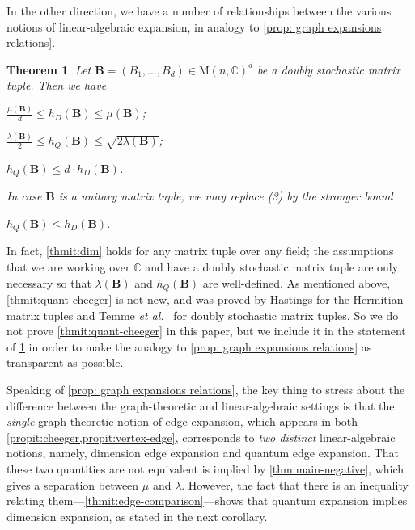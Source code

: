 \documentclass[11pt]{article}
\newtheorem{theorem}{Theorem}[section]
\theoremstyle{plain}
\numberwithin{equation}{section}
\theoremstyle{definition}
\newcommand{\bC}{\mathbb{C}}
\newcommand{\M}{\mathrm{M}}
\newcommand{\tuple}[1]{\mathbf{#1}}
\newcommand{\vB}{\tuple{B}}
\begin{document}
In the other direction, we have a number of relationships between the various notions of linear-algebraic expansion, in analogy to \cref{prop: graph expansions relations}.
\begin{theorem}\label{thm:main-relationships}
    Let $\vB=(B_1,\dots,B_d) \in \M(n,\bC)^d$ be a doubly stochastic matrix tuple. Then we have
    \begin{thmenum}
        \item $\frac {\mu(\vB)}d \leq h_D(\vB) \leq \mu(\vB)$;\label{thmit:dim}
        \item $\frac{\lambda(\vB)}{2} \leq h_Q(\vB) \leq \sqrt{2\lambda(\vB)}$;\label{thmit:quant-cheeger}
        \item $h_Q(\vB) \leq d\cdot h_D(\vB)$.\label{thmit:edge-comparison}
    \end{thmenum}
    In case $\vB$ is a unitary matrix tuple, we may replace {\rm (3)} by the stronger bound
    \begin{thmenum}[start=4]
        \item $h_Q(\vB) \leq h_D(\vB)$.\label{thmit:unitary-edge-comparison}
    \end{thmenum}
\end{theorem}
In fact, \cref{thmit:dim} holds for any matrix tuple over any field; the assumptions that we are working over $\bC$ and have a doubly stochastic matrix tuple are only necessary so that $\lambda(\vB)$ and $h_Q(\vB)$ are well-defined. As mentioned above, \cref{thmit:quant-cheeger} is not new, and was proved by Hastings \cite[Appendix A]{PhysRevA.76.032315} for the Hermitian matrix tuples and Temme \emph{et al.}~\cite[Lemma 20]{10.1063/1.3511335} for doubly stochastic matrix tuples. So we do not prove \cref{thmit:quant-cheeger} in this paper, but we include it in the statement of \cref{thm:main-relationships} in order to make the analogy to \cref{prop: graph expansions relations} as transparent as possible.

Speaking of \cref{prop: graph expansions relations}, the key thing to stress about the difference between the graph-theoretic and linear-algebraic settings is that the \emph{single} graph-theoretic notion of edge expansion, which appears in both \cref{propit:cheeger,propit:vertex-edge}, corresponds to \emph{two distinct} linear-algebraic notions,
namely,  %
dimension edge expansion and quantum edge expansion. That these two quantities are not equivalent is implied by \cref{thm:main-negative}, which gives a separation between $\mu$ and $\lambda$. However, the fact that there is an inequality relating them---\cref{thmit:edge-comparison}---shows that quantum expansion implies dimension expansion, as stated in the next corollary.
\end{document}
